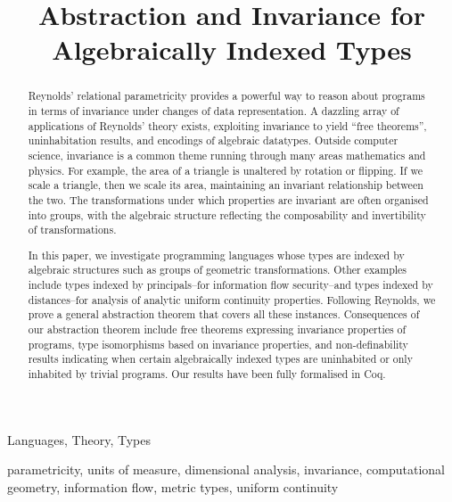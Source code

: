 \documentclass[preprint]{sigplanconf}
\title{Abstraction and Invariance for Algebraically Indexed Types}
\theoremstyle{examplestyle}
\theoremstyle{restatementstyle}
\begin{document}
\maketitle

\begin{abstract}
  Reynolds' relational parametricity provides a powerful way to reason
  about programs in terms of invariance under changes of data
  representation. A dazzling array of applications of Reynolds' theory
  exists, exploiting invariance to yield ``free theorems'',
  uninhabitation results, and encodings of algebraic datatypes.
  Outside computer science, invariance is a common theme running
  through many areas mathematics and physics. For example, the area of
  a triangle is unaltered by rotation or flipping. If we scale a
  triangle, then we scale its area, maintaining an invariant
  relationship between the two. The transformations under which
  properties are invariant are often organised into groups, with the
  algebraic structure reflecting the composability and invertibility
  of transformations.

  In this paper, we investigate programming languages whose types are
  indexed by algebraic structures such as groups of geometric
  transformations. Other examples include types indexed by
  principals--for information flow security--and types indexed by
  distances--for analysis of analytic uniform continuity
  properties. Following Reynolds, we prove a general abstraction
  theorem that covers all these instances. Consequences of our
  abstraction theorem include free theorems expressing invariance
  properties of programs, type isomorphisms based on invariance
  properties, and non-definability results indicating when certain
  algebraically indexed types are uninhabited or only inhabited by
  trivial programs.  Our results have been fully formalised in Coq.
\end{abstract}

  

\terms
  Languages, Theory, Types

\keywords parametricity, units of measure, dimensional analysis,
invariance, computational geometry, information flow, metric types, uniform continuity







%


\end{document}
